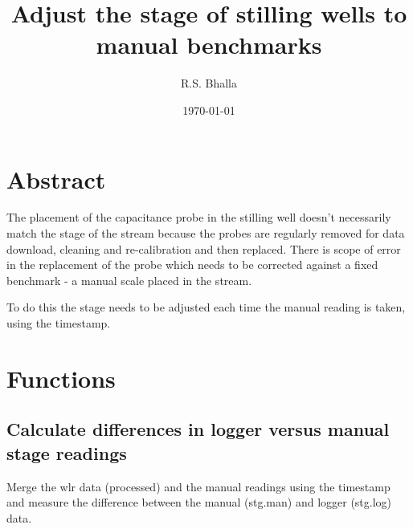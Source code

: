 \documentclass[a4paper]{article}
\author{R.S. Bhalla}
\date{\today}
\title{Adjust the stage of stilling wells to manual benchmarks}
\begin{document}
\maketitle
\setcounter{tocdepth}{2}
\tableofcontents


\section*{Abstract}
\label{sec:org40fef1b}

The placement of the capacitance probe in the stilling well doesn't necessarily match the stage of the stream because the probes are regularly removed for data download, cleaning and re-calibration and then replaced. There is scope of error in the replacement of the probe which needs to be corrected against a fixed benchmark - a manual scale placed in the stream.

To do this the stage needs to be adjusted each time the manual reading is taken, using the timestamp. 

\section*{Functions}
\label{sec:org7a13a3a}

\subsection*{Calculate differences in logger versus manual stage readings}
\label{sec:org883bcb0}

Merge the wlr data (processed) and the manual readings using the timestamp and measure the difference between the manual (stg.man) and logger (stg.log) data.
\end{document}
